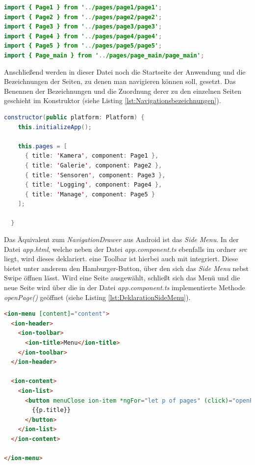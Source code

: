 \begin{lstlisting}[caption=Import der einzelnen Seiten für die Navigation in der Datei \textit{app.component.ts}, label=lst:app.component.tsImports, language=Java]
import { Page1 } from '../pages/page1/page1';
import { Page2 } from '../pages/page2/page2';
import { Page3 } from '../pages/page3/page3';
import { Page4 } from '../pages/page4/page4';
import { Page5 } from '../pages/page5/page5';
import { Page_main } from '../pages/page_main/page_main';
\end{lstlisting} 

Anschließend werden in dieser Datei noch die Startseite der Anwendung und die Bezeichnungen der Seiten, zu denen man navigieren können soll, gesetzt. Das Benennen der Bezeichnungen und die Zuordnung derer zu den einzelnen Seiten geschieht im Konstruktor (siehe Listing \ref{lst:Navigationsbezeichnungen}).

\begin{lstlisting}[caption=Setzen der Bezeichnungen der einzelnen Seiten für die Navigation, label=lst:Navigationsbezeichnungen, language=Java]
constructor(public platform: Platform) {
    this.initializeApp();

    this.pages = [
      { title: 'Kamera', component: Page1 },
      { title: 'Galerie', component: Page2 },
      { title: 'Sensoren', component: Page3 },
      { title: 'Logging', component: Page4 },
      { title: 'Manage', component: Page5 }
    ];

  }
\end{lstlisting} 

Das Äquivalent zum \textit{NavigationDrawer} aus Android ist das \textit{Side Menu}. In der Datei \textit{app.html}, welche neben der Datei \textit{app.component.ts} ebenfalls im ordner \textit{src} liegt, wird dieses deklariert. eine Toolbar ist hierbei auch mit integriert. Diese bietet unter anderem den Hamburger-Button, über den sich das \textit{Side Menu} nebst Swipe öffnen lässt. Wird eine Seite ausgewählt, schließt sich das Menü und die neue Seite wird über die in der Datei \textit{app.component.ts} implementierte Methode \textit{openPage()} geöffnet (siehe Listing \ref{lst:DeklarationSideMenu}).

\begin{lstlisting}[caption=Deklaration des \textit{Side Menus} in der Datei \textit{app.html}, label=lst:DeklarationSideMenu, language=html]
<ion-menu [content]="content">
  <ion-header>
    <ion-toolbar>
      <ion-title>Menu</ion-title>
    </ion-toolbar>
  </ion-header>

  <ion-content>
    <ion-list>
      <button menuClose ion-item *ngFor="let p of pages" (click)="openPage(p)">
        {{p.title}}
      </button>
    </ion-list>
  </ion-content>

</ion-menu>
\end{lstlisting}

